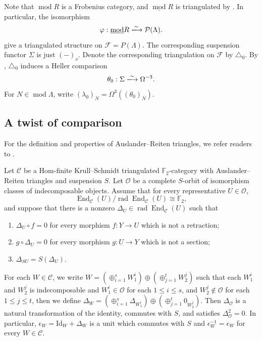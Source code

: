 \documentclass[a4paper,reqno,10pt]{amsart}
\numberwithin{equation}{section}
\DeclareMathOperator{\modu}{mod}
\DeclareMathOperator{\End}{End}
\newcommand{\kk}{\mathbb F_2}
\newcommand{\cF}{\mathcal F}
\newcommand{\cO}{\mathcal O}
\newcommand{\Lam}{\Lambda}
\newcommand{\eps}{\epsilon}
\newcommand{\ol}[1]{\underline{#1}}
\begin{document}
\begin{remark}\label{conv:transported-triangulation}
Note that $\modu R$ is a Frobenius category, and $\ol{\modu}R$ is triangulated by \cite[Chapter~I, Theorem~2.6]{Happel1988}. In particular, the isomorphism
\[
 \varphi:\ol{\modu}R\xlongrightarrow{\sim}\mathcal P(\Lam).
\]
give a triangulated structure on $\mathcal F=P(\Lam)$. The corresponding suspension functor $\Sigma$ is just $(-)_\nu$. Denote the corresponding triangulation on $\cF$ by $\triangle_0$. By , $\triangle_0$ induces a Heller comparison
\[
 \theta_0:\Sigma\xlongrightarrow{\sim}\Omega^{-3}.
\]
For $N\in\modu\Lam$, write
$(\lambda_0)_N=\Omega^3((\theta_0)_N)$.
\end{remark}


\subsection{A twist of comparison}\label{sec:parameter}


For the definition and properties of Auslander--Reiten triangles, we refer readers to \cite[Chapter I. 4]{Happel1988}.

\begin{lemma}\label{lem:orbit-twist}
Let $\mathcal C$ be a Hom-finite Krull--Schmidt triangulated
$\kk$-category with Auslander--Reiten triangles and suspension $S$.
Let $\cO$ be a complete $S$-orbit of isomorphism classes of indecomposable
objects. Assume that for every representative $U\in\cO$, 
\[
 \End_{\mathcal C}(U)/\operatorname{rad}\End_{\mathcal C}(U)\cong\kk, 
\]
and suppose that there is a nonzero
$\Delta_U\in\operatorname{rad}\End_{\mathcal C}(U)$ such that
\begin{enumerate}
 \item $\Delta_U\circ f=0$ for every morphism
 $f:Y\longrightarrow U$ which is not a retraction;
 \item $g\circ\Delta_U=0$ for every morphism
 $g:U\longrightarrow Y$ which is not a section;
 \item $\Delta_{SU}=S(\Delta_U)$.
\end{enumerate}
For each $W\in\mathcal C$, we write $W=(\oplus_{i=1}^s W_1^i)\oplus (\oplus_{j=1}^tW_2^j)$ such that each $W_1^i$ and $W_2^j$ is indecomposable and $W_1^i\in\cO$ for each $1\leq i\leq s$, and  $W_2^j\notin \cO$ for each $1\leq j\leq t$, then we define $\Delta_W=(\oplus_{i=1}^s \Delta_{W_1^i})\oplus (\oplus_{j=1}^t 0_{W_2^j})$.
Then $\Delta_{\cO}$ is a natural transformation of the identity,
commutes with $S$, and satisfies $\Delta_{\cO}^2=0$. In particular, $\eps_{W}=\mathrm{Id}_W+\Delta_{W}$ is a unit which commutes with $S$ and
$\eps_{W}^{-1}=\eps_{W}$ for every $W\in\mathcal C$.
\end{lemma}
\end{document}
